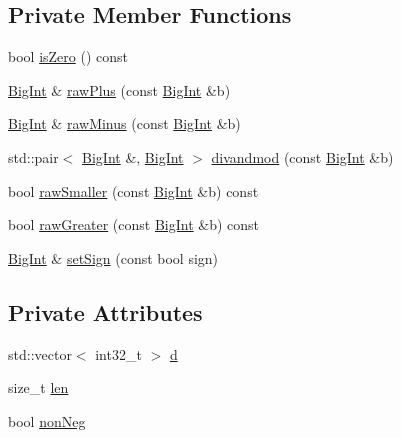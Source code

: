 \subsection*{Private Member Functions}
\begin{DoxyCompactItemize}
\item 
bool \hyperlink{class_big_int_a9b728ee8c6214feee03d15885dc3f877}{is\+Zero} () const 
\item 
\hyperlink{class_big_int}{Big\+Int} \& \hyperlink{class_big_int_a51120af6199fce924122ec944d65ce00}{raw\+Plus} (const \hyperlink{class_big_int}{Big\+Int} \&b)
\item 
\hyperlink{class_big_int}{Big\+Int} \& \hyperlink{class_big_int_a467335bcd608b80a7e09ae3ce112b95c}{raw\+Minus} (const \hyperlink{class_big_int}{Big\+Int} \&b)
\item 
std\+::pair$<$ \hyperlink{class_big_int}{Big\+Int} \&, \hyperlink{class_big_int}{Big\+Int} $>$ \hyperlink{class_big_int_a5a7f5fa6ddac244484ec62d3187ebb92}{divandmod} (const \hyperlink{class_big_int}{Big\+Int} \&b)
\item 
bool \hyperlink{class_big_int_af71469db665f6e014869def10d28e62f}{raw\+Smaller} (const \hyperlink{class_big_int}{Big\+Int} \&b) const 
\item 
bool \hyperlink{class_big_int_a70b66d14ed0dd00b329abfc339368717}{raw\+Greater} (const \hyperlink{class_big_int}{Big\+Int} \&b) const 
\item 
\hyperlink{class_big_int}{Big\+Int} \& \hyperlink{class_big_int_a2f8c95c555bc0bcde86daf4de40730c5}{set\+Sign} (const bool sign)
\end{DoxyCompactItemize}
\subsection*{Private Attributes}
\begin{DoxyCompactItemize}
\item 
std\+::vector$<$ int32\+\_\+t $>$ \hyperlink{class_big_int_a55b39aa05dd18b09fe30df43e13936d9}{d}
\item 
size\+\_\+t \hyperlink{class_big_int_a72594f018514454b2bf2a398ed21e4a6}{len}
\item 
bool \hyperlink{class_big_int_afc36eaf290d1b537127ba9f651b5db86}{non\+Neg}
\end{DoxyCompactItemize}
